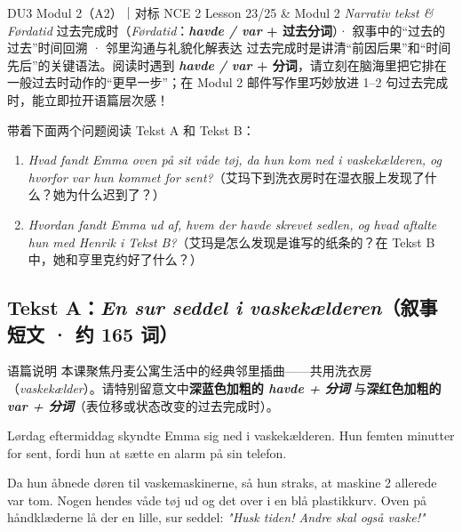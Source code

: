 {DU3 Modul 2（A2）｜对标 NCE 2 Lesson 23/25 \& Modul 2 \textit{Narrativ tekst \& Førdatid}}
{过去完成时（\textit{Førdatid}：\textbf{\textit{havde / var} + 过去分词}）· 叙事中的“过去的过去”时间回溯 · 邻里沟通与礼貌化解表达}
{过去完成时是讲清“前因后果”和“时间先后”的关键语法。阅读时遇到 \textbf{\textit{havde / var} + 分词}，请立刻在脑海里把它排在一般过去时动作的“更早一步”；在 Modul 2 邮件写作里巧妙放进 1--2 句过去完成时，能立即拉开语篇层次感！}

\begin{foerduleaeser}
带着下面两个问题阅读 Tekst A 和 Tekst B：
\begin{enumerate}
  \item \textit{Hvad fandt Emma oven på sit våde tøj, da hun kom ned i vaskekælderen, og hvorfor var hun kommet for sent?}（艾玛下到洗衣房时在湿衣服上发现了什么？她为什么迟到了？）
  \item \textit{Hvordan fandt Emma ud af, hvem der havde skrevet sedlen, og hvad aftalte hun med Henrik i Tekst B?}（艾玛是怎么发现是谁写的纸条的？在 Tekst B 中，她和亨里克约好了什么？）
\end{enumerate}
\end{foerduleaeser}


\subsection*{Tekst A：\textit{En sur seddel i vaskekælderen}（叙事短文 · 约 165 词）}

\begin{tipbox}{语篇说明}
本课聚焦丹麦公寓生活中的经典邻里插曲——共用洗衣房（\textit{vaskekælder}）。请特别留意文中\textbf{\color{NCDNavy}深蓝色加粗的 \textit{havde + 分词}} 与\textbf{\color{NCDRed}深红色加粗的 \textit{var + 分词}}（表位移或状态改变的过去完成时）。
\end{tipbox}

Lørdag eftermiddag skyndte Emma sig ned i vaskekælderen. Hun  femten minutter for sent, fordi hun  at sætte en alarm på sin telefon.

Da hun åbnede døren til vaskemaskinerne, så hun straks, at maskine 2 allerede var tom. Nogen  hendes våde tøj ud og  det over i en blå plastikkurv. Oven på håndklæderne lå der en lille, sur seddel: \textit{"Husk tiden! Andre skal også vaske!"}

